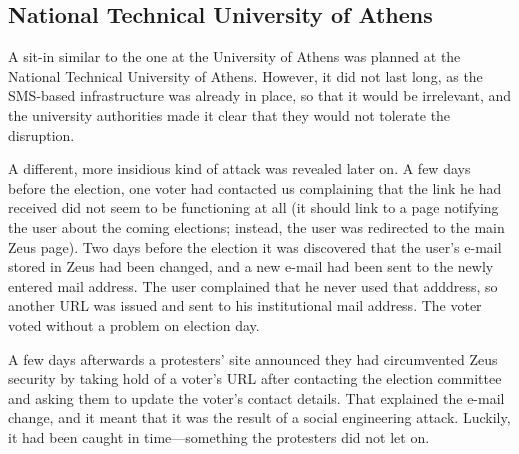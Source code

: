 \documentclass[letterpaper,twocolumn,10pt]{article}
\begin{document}
\subsection{National Technical University of Athens}

A sit-in similar to the one at the University of Athens was planned at
the National Technical University of Athens. However, it did not last
long, as the SMS-based infrastructure was already in place, so that it
would be irrelevant, and the university authorities made it clear that
they would not tolerate the disruption.

A different, more insidious kind of attack was revealed later on. A
few days before the election, one voter had contacted us complaining
that the link he had received did not seem to be functioning at all
(it should link to a page notifying the user about the coming
elections; instead, the user was redirected to the main Zeus page).
Two days before the election it was discovered that the user's e-mail
stored in Zeus had been changed, and a new e-mail had been sent to the
newly entered mail address. The user complained that he never used
that adddress, so another URL was issued and sent to his institutional
mail address. The voter voted without a problem on election day.

A few days afterwards a protesters' site announced they had
circumvented Zeus security by taking hold of a voter's URL after
contacting the election committee and asking them to update the
voter's contact details. That explained the e-mail change, and it
meant that it was the result of a social engineering attack. Luckily,
it had been caught in time---something the protesters did not let on.
\end{document}
